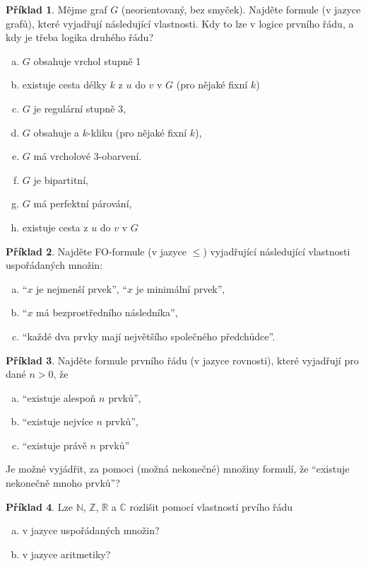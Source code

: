 \documentclass{amsart}
\theoremstyle{definition}
\newtheorem{problem}{Příklad}
\begin{document}
\smallskip
\begin{problem}
Mějme graf $G$ (neorientovaný, bez smyček). Najděte formule (v jazyce grafů), které vyjadřují následující vlastnosti. Kdy to lze v logice prvního řádu, a kdy je třeba logika druhého řádu?
\begin{enumerate}[(a)]
    \item $G$ obsahuje vrchol stupně 1
   \item existuje cesta délky $k$ z $u$ do $v$ v $G$ (pro nějaké fixní $k$)
    \item $G$ je regulární stupně 3,
    \item $G$ obsahuje a $k$-kliku (pro nějaké fixní $k$),
    \item $G$ má vrcholové 3-obarvení.
    \item $G$ je bipartitní,
    \item $G$ má perfektní párování,
    \item existuje cesta z $u$ do $v$ v $G$
\end{enumerate}
\end{problem}


\smallskip
\begin{problem} Najděte FO-formule (v jazyce $\le$) vyjadřující následující vlastnosti uspořádaných množin:
\begin{enumerate}[(a)]
\item ``$x$ je nejmenší prvek'', ``$x$ je minimální prvek'',
\item ``$x$ má bezprostředního následníka'',
\item ``každé dva prvky mají největšího společného předchůdce''.
\end{enumerate}
\end{problem}


\smallskip
\begin{problem} Najděte formule prvního řádu (v jazyce rovnosti), které vyjadřují pro dané $n>0$, že
\begin{enumerate}[(a)]
\item ``existuje alespoň $n$ prvků'',
\item ``existuje nejvíce $n$ prvků'',
\item ``existuje právě  $n$ prvků''
\end{enumerate}
Je možné vyjádřit, za pomoci (možná nekonečné) množiny formulí, že ``existuje nekonečně mnoho prvků''?
\end{problem}

\smallskip
\begin{problem}
Lze $\mathbb N$, $\mathbb Z$, $\mathbb R$ a $\mathbb C$ rozlišit pomocí vlastností prvího řádu
\begin{enumerate}[(a)]
\item v jazyce uspořádaných množin?
\item v jazyce aritmetiky?
\end{enumerate}
\end{problem}
\end{document}
